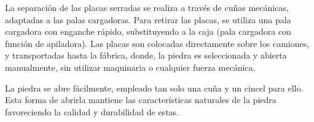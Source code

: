 La separación de las placas serradas se realiza a través de cuñas
mecánicas, adaptadas a las palas cargadoras. Para retirar las
placas, se utiliza una pala cargadora con enganche rápido,
substituyendo a la caja (pala cargadora con función de apiladora).
Las placas son colocadas directamente sobre los camiones, y transportadas hasta la fábrica,
donde, la piedra es seleccionada y abierta manualmente, sin utilizar maquinaria o cualquier
fuerza mecánica.

La piedra se abre fácilmente, empleado tan solo una cuña y un cincel para ello. Esta forma de
abrirla mantiene las características naturales de la piedra favoreciendo la calidad y durabilidad
de estas.

